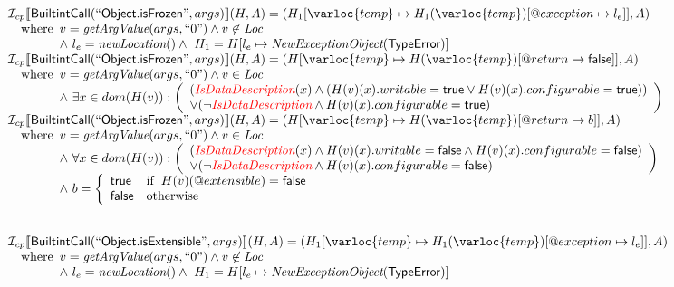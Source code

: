 \[\begin{array}{l}
\I _{cp}\lbr \SF{BuiltintCall}(``\SF{Object.isFrozen}",args)\rbr(H,A)
 = (H_1[\varloc{temp}\mapsto H_1(\varloc{temp})[\varprop{exception}\mapsto l_{e}]], A) \\
\quad\wherec{
  v = \hf{getArgValue}(args, ``0") \land v\not\in\Loc\\
  \land\ l_e = \hf{newLocation}() \land\ H_1=H[l_e\mapsto\hf{NewExceptionObject}(\SF{TypeError})] }\\
  
\I _{cp}\lbr \SF{BuiltintCall}(``\SF{Object.isFrozen}",args)\rbr(H,A)
 = (H[\varloc{temp}\mapsto H(\varloc{temp})[\varprop{return}\mapsto \SF{false}]], A) \\
\quad\wherec{
  v = \hf{getArgValue}(args, ``0") \land v  \in\Loc\\
  \land\ \exists x \in dom(H(v)) :\left(
    \begin{array}{l}
      (\hf{\inred IsDataDescription}(x) \land (H(v)(x).writable = \SF{true} \lor H(v)(x).configurable = \SF{true}))\\
      \lor (\neg \hf{\inred IsDataDescription} \land H(v)(x).configurable = \SF{true})
    \end{array}\right)
  }\\
   
\I _{cp}\lbr \SF{BuiltintCall}(``\SF{Object.isFrozen}",args)\rbr(H,A)
 = (H[\varloc{temp}\mapsto H(\varloc{temp})[\varprop{return}\mapsto b]], A) \\
\quad\wherec{
  v = \hf{getArgValue}(args, ``0") \land v  \in\Loc\\
  \land\ \forall x \in dom(H(v)) :\left(
    \begin{array}{l}
      (\hf{\inred IsDataDescription}(x) \land H(v)(x).writable = \SF{false} \land H(v)(x).configurable = \SF{false})\\
      \lor (\neg \hf{\inred IsDataDescription} \land H(v)(x).configurable = \SF{false})
    \end{array}\right)\\
  \land\ b = \left\{
    \begin{array}{ll}
      \SF{true} & \ifc{H(v)(@extensible) = \SF{false}}\\
      \SF{false} & \owc
    \end{array}\right.
   }\\
\\\\

\I _{cp}\lbr \SF{BuiltintCall}(``\SF{Object.isExtensible}",args)\rbr(H,A)
 = (H_1[\varloc{temp}\mapsto H_1(\varloc{temp})[\varprop{exception}\mapsto l_{e}]], A) \\
\quad\wherec{
  v = \hf{getArgValue}(args, ``0") \land v\not\in\Loc\\
  \land\ l_e = \hf{newLocation}() \land\ H_1=H[l_e\mapsto\hf{NewExceptionObject}(\SF{TypeError})] }\\
  

\end{array}\]
